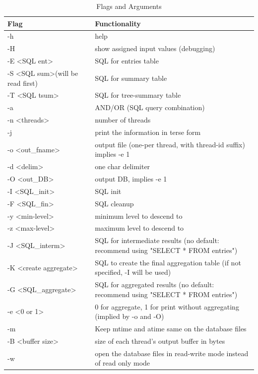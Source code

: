 \documentclass{article}
\begin{document}
\begin{table} [h]
\centering
\begin{tabular}{l|p{6cm}}
Flag & Functionality \\\hline
-h & help\\
\hline
-H & show assigned input values (debugging)\\
\hline
-E \textless SQL ent\textgreater & SQL for entries table \\
\hline
-S \textless SQL sum\textgreater (will be read first) & SQL for summary table\\
\hline
-T \textless SQL tsum\textgreater & SQL for tree-summary table\\
\hline
-a & AND/OR (SQL query combination)\\
\hline
-n \textless threads\textgreater & number of threads\\
\hline
-j & print the information in terse form\\
\hline
-o \textless out\_fname\textgreater & output file (one-per thread, with thread-id suffix) implies -e 1\\
\hline
-d \textless delim\textgreater & one char delimiter \\
\hline
-O \textless out\_DB\textgreater & output DB, implies -e 1 \\
\hline
-I \textless SQL\_init\textgreater & SQL init \\
\hline
-F \textless SQL\_fin\textgreater & SQL cleanup \\
\hline
-y \textless min-level\textgreater & minimum level to descend to \\
\hline
-z \textless max-level\textgreater & maximum level to descend to\\
\hline
-J \textless SQL\_interm\textgreater & SQL for intermediate results (no default: recommend using "SELECT * FROM entries") \\
\hline
-K \textless create aggregate\textgreater & SQL to create the final aggregation table (if not specified, -I will be used)\\
\hline
-G \textless SQL\_aggregate\textgreater & SQL for aggregated results (no default: recommend using "SELECT * FROM entries")\\
\hline
-e \textless 0 or 1\textgreater & 0 for aggregate, 1 for print without aggregating (implied by -o and -O)\\
\hline
-m & Keep mtime and atime same on the database files \\
\hline
-B \textless buffer size\textgreater & size of each thread's output buffer in bytes \\
\hline
-w & open the database files in read-write mode instead of read only mode
\end{tabular}
\caption{\label{tab:widgets}Flags and Arguments}
\end{table}
\end{document}
